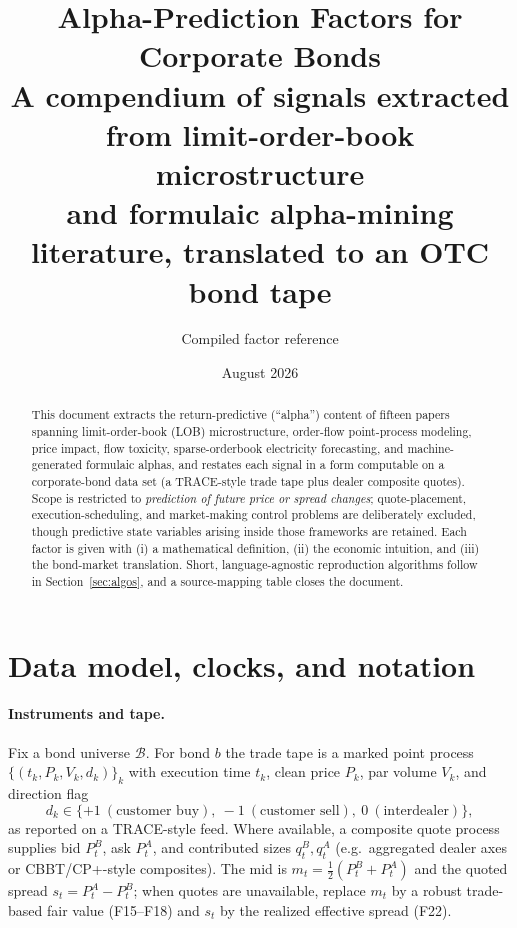 \documentclass[11pt]{article}
\title{\textbf{Alpha-Prediction Factors for Corporate Bonds}\\[4pt]
\large A compendium of signals extracted from limit-order-book microstructure\\ and formulaic alpha-mining literature, translated to an OTC bond tape}
\author{Compiled factor reference}
\date{August 2026}
\newcounter{algo}
\newcounter{fac}
\begin{document}
\maketitle

\begin{abstract}
\noindent This document extracts the return-predictive (``alpha'') content of fifteen papers spanning limit-order-book (LOB) microstructure, order-flow point-process modeling, price impact, flow toxicity, sparse-orderbook electricity forecasting, and machine-generated formulaic alphas, and restates each signal in a form computable on a corporate-bond data set (a TRACE-style trade tape plus dealer composite quotes). Scope is restricted to \emph{prediction of future price or spread changes}; quote-placement, execution-scheduling, and market-making control problems are deliberately excluded, though predictive state variables arising inside those frameworks are retained. Each factor is given with (i) a mathematical definition, (ii) the economic intuition, and (iii) the bond-market translation. Short, language-agnostic reproduction algorithms follow in Section~\ref{sec:algos}, and a source-mapping table closes the document.
\end{abstract}

\tableofcontents

\section{Data model, clocks, and notation}\label{sec:notation}

\paragraph{Instruments and tape.} Fix a bond universe $\mathcal{B}$. For bond $b$ the trade tape is a marked point process $\{(t_k, P_k, V_k, d_k)\}_k$ with execution time $t_k$, clean price $P_k$, par volume $V_k$, and direction flag
\[
d_k \in \{+1 \ (\text{customer buy}),\ -1 \ (\text{customer sell}),\ 0 \ (\text{interdealer})\},
\]
as reported on a TRACE-style feed. Where available, a composite quote process supplies bid $P^B_t$, ask $P^A_t$, and contributed sizes $q^B_t, q^A_t$ (e.g.\ aggregated dealer axes or CBBT/CP+-style composites). The mid is $m_t = \tfrac12(P^B_t + P^A_t)$ and the quoted spread $s_t = P^A_t - P^B_t$; when quotes are unavailable, replace $m_t$ by a robust trade-based fair value (F15--F18) and $s_t$ by the realized effective spread (F22).
\end{document}
